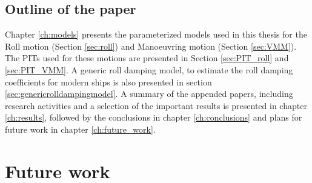 \section{Outline of the paper}
Chapter \ref{ch:models} presents the parameterized models used in this thesis for the Roll motion (Section \ref{sec:roll}) and Manoeuvring motion (Section \ref{sec:VMM}). The PITs used for these motions are presented in Section \ref{sec:PIT_roll} and \ref{sec:PIT_VMM}. A generic roll damping model, to estimate the roll damping coefficients for modern ships is also presented in section \ref{sec:genericrolldampingmodel}.
A summary of the appended papers, including research activities and a selection of the important results is presented in chapter \ref{ch:results}, followed by the conclusions in chapter \ref{ch:conclusions} and plans for future work in chapter \ref{ch:future_work}.






\chapter{Future work\label{ch:future_work}}

